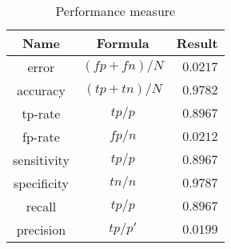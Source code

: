 \begin{table}
    \centering
    \begin{tabular}{|c|c|r|}\hline
    Name        & Formula       &   Result      \\\hline
    error       & $(fp+fn)/N$   &   $0.0217$    \\
    accuracy    & $(tp+tn)/N$   &   $0.9782$    \\\hline
    tp-rate     & $tp/p$        &   $0.8967$    \\
    fp-rate     & $fp/n$        &   $0.0212$    \\\hline
    sensitivity & $tp/p$        &   $0.8967$    \\
    specificity & $tn/n$        &   $0.9787$    \\\hline
    recall      & $tp/p$        &   $0.8967$    \\
    precision   & $tp/p'$       &   $0.0199$    \\\hline
    \end{tabular}
    \caption{Performance measure}
    \label{tab:performance}
\end{table}